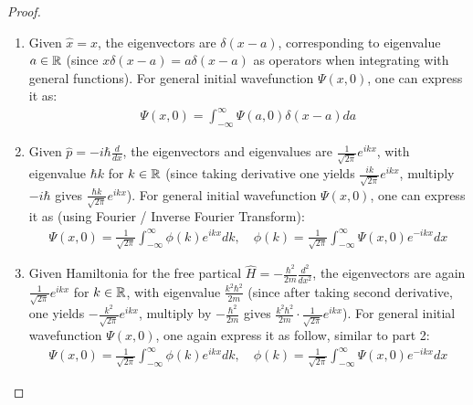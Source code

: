 \documentclass{article}
\begin{document}
\begin{proof}

    \hfil

    \begin{enumerate}
        \item Given $\hat{x}=x$, the eigenvectors are $\delta(x-a)$, corresponding to eigenvalue $a\in\mathbb{R}$ (since $x\delta(x-a) = a\delta(x-a)$ as operators when integrating with general functions). For general initial wavefunction $\Psi(x,0)$, one can express it as:
        \begin{align}
            \Psi(x,0) = \int_{-\infty}^{\infty}\Psi(a,0)\delta(x-a)da
        \end{align}

        \hfil

        \item Given $\hat{p} = -i\hbar\frac{d}{dx}$, the eigenvectors and eigenvalues are $\frac{1}{\sqrt{2\pi}}e^{ikx}$, with eigenvalue $\hbar k$ for $k\in\mathbb{R}$ (since taking derivative one yields $\frac{ik}{\sqrt{2\pi}}e^{ikx}$, multiply $-i\hbar$ gives $\frac{\hbar k}{\sqrt{2\pi}}e^{ikx}$). For general initial wavefunction $\Psi(x,0)$, one can express it as (using Fourier / Inverse Fourier Transform):
        \begin{align}
            \Psi(x,0) = \frac{1}{\sqrt{2\pi}}\int_{-\infty}^{\infty}\phi(k)e^{ikx}dk,\quad \phi(k) = \frac{1}{\sqrt{2\pi}}\int_{-\infty}^{\infty}\Psi(x,0)e^{-ikx}dx
        \end{align}

        \hfil

        \item Given Hamiltonia for the free partical $\hat{H}=-\frac{\hbar^2}{2m}\frac{d^2}{dx^2}$, the eigenvectors are again $\frac{1}{\sqrt{2\pi}}e^{ikx}$ for $k\in\mathbb{R}$, with eigenvalue $\frac{k^2\hbar^2}{2m}$ (since after taking second derivative, one yields $-\frac{k^2}{\sqrt{2\pi}}e^{ikx}$, multiply by $-\frac{\hbar^2}{2m}$ gives $\frac{k^2\hbar^2}{2m}\cdot\frac{1}{\sqrt{2\pi}}e^{ikx}$). For general initial wavefunction $\Psi(x,0)$, one again express it as follow, similar to part 2:
        \begin{align}
            \Psi(x,0) = \frac{1}{\sqrt{2\pi}}\int_{-\infty}^{\infty}\phi(k)e^{ikx}dk,\quad \phi(k) = \frac{1}{\sqrt{2\pi}}\int_{-\infty}^{\infty}\Psi(x,0)e^{-ikx}dx
        \end{align}

        \hfil


\end{enumerate}
\end{proof}
\end{document}
